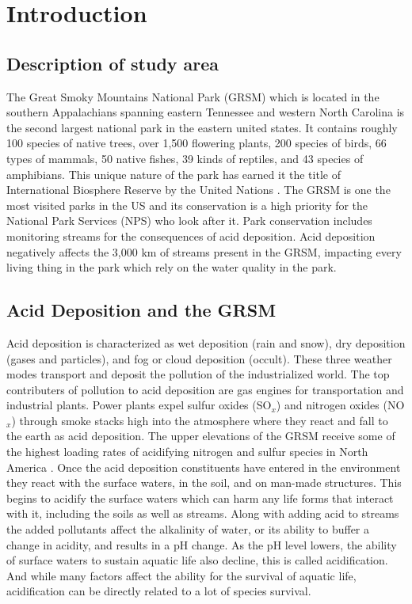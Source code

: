 \chapter{Introduction} \label{ch:intro}

\section{Description of study area} %

The Great Smoky Mountains National Park (GRSM) which is located in the southern Appalachians spanning eastern Tennessee and western North Carolina is the second largest national park in the eastern united states.
It contains roughly 100 species of native trees, over 1,500 flowering plants, 200 species of birds, 66 types of mammals, 50 native fishes, 39 kinds of reptiles, and 43 species of amphibians.
This unique nature of the park has earned it the title of  International Biosphere Reserve by the United Nations \citep{NPS}.	
The GRSM is one the most visited parks in the US and its conservation is a high priority for the National Park Services (NPS) who look after it.		
Park conservation includes monitoring streams for the consequences of acid deposition.	
Acid deposition negatively affects the 3,000 km of streams present in the GRSM, impacting every living thing in the park which rely on the water quality in the park.  
	
\section{Acid Deposition and the GRSM}

Acid deposition is characterized as wet deposition (rain and snow), dry deposition (gases and particles), and fog or cloud deposition (occult).
These three weather modes transport and deposit the pollution of the industrialized world.
The top contributers of pollution to acid deposition are gas engines for transportation and industrial plants.
Power plants expel sulfur oxides (SO$_x$) and nitrogen oxides (NO$_x$) through smoke stacks high into the atmosphere where they react and fall to the earth as acid deposition.
The upper elevations of the GRSM receive some of the highest loading rates of acidifying nitrogen and sulfur species in North America \citep{johnson1992atmospheric}.  
Once the acid deposition constituents have entered in the environment they react with the surface waters, in the soil, and on man-made structures\citep{board1983acid}.  
This begins to acidify the surface waters which can harm any life forms that interact with it, including the soils as well as streams.
Along with adding acid to streams the added pollutants affect the alkalinity of water, or its ability to buffer a change in acidity,  and results in a pH change.  
As the pH level lowers, the ability of surface waters to sustain aquatic life also decline, this is called acidification. 
And while many factors affect the ability for the survival of aquatic life, acidification can be directly related to a lot of species survival.  

